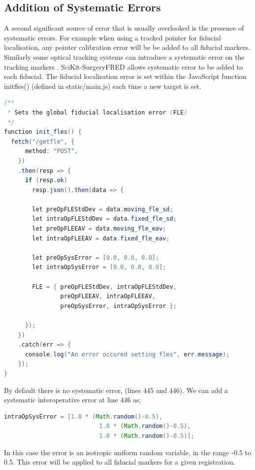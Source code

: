 \subsection{Addition of Systematic Errors}
\label{sec:sys_method}
A second significant source of error that is usually overlooked is the presence of systematic errors. For example when using a tracked pointer for fiducial localisation, 
any pointer calibration error will be be added to all fiducial markers.
Similarly some optical tracking systems can introduce a systematic error on 
the tracking markers \cite{6294449}. {SciKit-SurgeryFRED} allows systematic error to 
be added to each fiducial. The fiducial localisation error is set within 
the JavaScript function init{\textunderscore}fles()
(defined in static/main.js) each time a new target is set. 
\begin{lstlisting}[language=java, firstnumber = 429]
/**
 * Sets the global fiducial localisation error (FLE)
 */
function init_fles() {
  fetch("/getfle", {
      method: "POST",
    })
    .then(resp => {
      if (resp.ok)
        resp.json().then(data => {

        let preOpFLEStdDev = data.moving_fle_sd;
        let intraOpFLEStdDev = data.fixed_fle_sd;
        let preOpFLEEAV = data.moving_fle_eav;
        let intraOpFLEEAV = data.fixed_fle_eav;

        let preOpSysError = [0.0, 0.0, 0.0];
        let intraOpSysError = [0.0, 0.0, 0.0];

        FLE = { preOpFLEStdDev, intraOpFLEStdDev,
                preOpFLEEAV, intraOpFLEEAV,
                preOpSysError, intraOpSysError };

      });
    })
    .catch(err => {
      console.log("An error occured setting fles", err.message);
    });
}
\end{lstlisting}
By default there is no systematic error, (lines 445 and 446). We can 
add a systematic interoperative error at line 446 as; 

\begin{lstlisting}[language=java, firstnumber = 446]
        intraOpSysError = [1.0 * (Math.random()-0.5), 
                           1.0 * (Math.random()-0.5), 
                           1.0 * (Math.random()-0.5)];
\end{lstlisting}

In this case the error is an isotropic uniform random variable, in the range
-0.5 to 0.5. This error will be applied to all fiducial markers for a 
given registration. 



